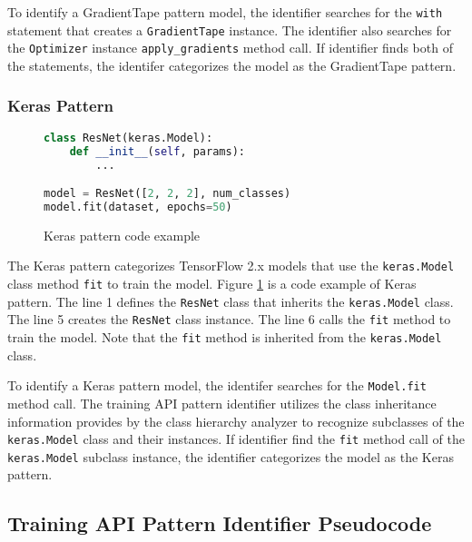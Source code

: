 To identify a GradientTape pattern model,
the identifier searches for the {\tt with} statement that creates a
{\tt GradientTape} instance.
The identifier also searches for the {\tt Optimizer} instance 
{\tt apply\_gradients} method call.
If identifier finds both of the statements, the identifer categorizes the
model as the GradientTape pattern.


\subsubsection{Keras Pattern}

\begin{figure}[ht!]
  \begin{lstlisting}[language=Python]
class ResNet(keras.Model):
    def __init__(self, params):
        ...

model = ResNet([2, 2, 2], num_classes)
model.fit(dataset, epochs=50)\end{lstlisting}
 
  \caption{Keras pattern code example}
  \label{fig:keraspattern}
\end{figure}

The Keras pattern categorizes TensorFlow 2.x models that use
the {\tt keras.Model} class method {\tt fit} to train the model. 
Figure \ref{fig:keraspattern} is a code example of Keras pattern.
The line 1 defines the {\tt ResNet} class that inherits the 
{\tt keras.Model} class. 
The line 5 creates the {\tt ResNet} class instance.
The line 6 calls the {\tt fit} method to train the model.
Note that the {\tt fit} method is inherited from the {\tt keras.Model} class.

To identify a Keras pattern model, the identifer searches for the
{\tt Model.fit} method call. The training API pattern identifier utilizes the
class inheritance information provides by the class hierarchy analyzer to
recognize subclasses of the {\tt keras.Model} class and their instances.
If identifier find the {\tt fit} method call of the {\tt keras.Model} subclass
instance, the identifier categorizes the model as the Keras pattern.

\subsection{Training API Pattern Identifier Pseudocode}



